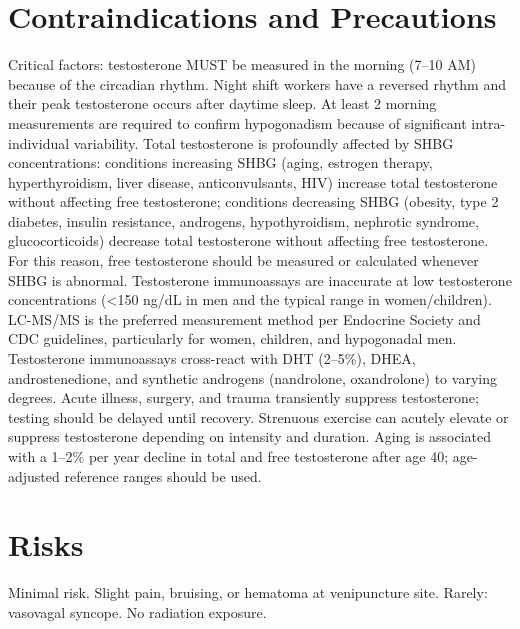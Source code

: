 \section*{Contraindications and Precautions}
Critical factors: testosterone MUST be measured in the morning (7--10 AM) because of the circadian rhythm. Night shift workers have a reversed rhythm and their peak testosterone occurs after daytime sleep. At least 2 morning measurements are required to confirm hypogonadism because of significant intra-individual variability. Total testosterone is profoundly affected by SHBG concentrations: conditions increasing SHBG (aging, estrogen therapy, hyperthyroidism, liver disease, anticonvulsants, HIV) increase total testosterone without affecting free testosterone; conditions decreasing SHBG (obesity, type 2 diabetes, insulin resistance, androgens, hypothyroidism, nephrotic syndrome, glucocorticoids) decrease total testosterone without affecting free testosterone. For this reason, free testosterone should be measured or calculated whenever SHBG is abnormal. Testosterone immunoassays are inaccurate at low testosterone concentrations (<150 ng/dL in men and the typical range in women/children). LC-MS/MS is the preferred measurement method per Endocrine Society and CDC guidelines, particularly for women, children, and hypogonadal men. Testosterone immunoassays cross-react with DHT (2--5\%), DHEA, androstenedione, and synthetic androgens (nandrolone, oxandrolone) to varying degrees. Acute illness, surgery, and trauma transiently suppress testosterone; testing should be delayed until recovery. Strenuous exercise can acutely elevate or suppress testosterone depending on intensity and duration. Aging is associated with a 1--2\% per year decline in total and free testosterone after age 40; age-adjusted reference ranges should be used.

\section*{Risks}
Minimal risk. Slight pain, bruising, or hematoma at venipuncture site. Rarely: vasovagal syncope. No radiation exposure.

